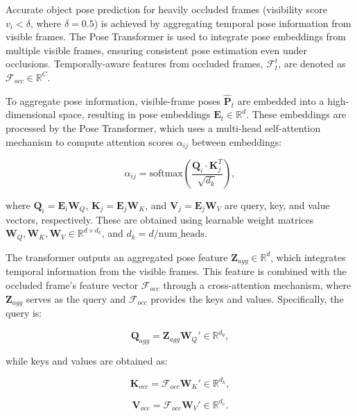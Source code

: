 Accurate object pose prediction for heavily occluded frames (visibility score $v_i < \delta$, where $\delta = 0.5$) is achieved by aggregating temporal pose information from visible frames. The Pose Transformer is used to integrate pose embeddings from multiple visible frames, ensuring consistent pose estimation even under occlusions. Temporally-aware features from occluded frames, $\mathcal{F}^t_t$, are denoted as $\mathcal{F}_{occ} \in \mathbb{R}^C$.

To aggregate pose information, visible-frame poses $\hat{\mathbf{P}}_t$ are embedded into a high-dimensional space, resulting in pose embeddings $\mathbf{E}_t \in \mathbb{R}^d$. These embeddings are processed by the Pose Transformer, which uses a multi-head self-attention mechanism to compute attention scores $\alpha_{ij}$ between embeddings:

\begin{equation}
\alpha_{ij} = \text{softmax}\left(\frac{\mathbf{Q}_i \cdot \mathbf{K}_j^T}{\sqrt{d_k}}\right),
\end{equation}

\noindent where $\mathbf{Q}_i = \mathbf{E}_i \mathbf{W}_Q$, $\mathbf{K}_j = \mathbf{E}_j \mathbf{W}_K$, and $\mathbf{V}_j = \mathbf{E}_j \mathbf{W}_V$ are query, key, and value vectors, respectively. These are obtained using learnable weight matrices $\mathbf{W}_Q, \mathbf{W}_K, \mathbf{W}_V \in \mathbb{R}^{d \times d_k}$, and $d_k = d / \text{num\_heads}$.

The transformer outputs an aggregated pose feature $\mathbf{Z}_{agg} \in \mathbb{R}^d$, which integrates temporal information from the visible frames. This feature is combined with the occluded frame's feature vector $\mathcal{F}_{occ}$ through a cross-attention mechanism, where $\mathbf{Z}_{agg}$ serves as the query and $\mathcal{F}_{occ}$ provides the keys and values. Specifically, the query is:

\begin{equation}
\mathbf{Q}_{agg} = \mathbf{Z}_{agg} \mathbf{W}_Q' \in \mathbb{R}^{d_q},
\end{equation}

\noindent while keys and values are obtained as:

\begin{equation}
\mathbf{K}_{occ} = \mathcal{F}_{occ} \mathbf{W}_K' \in \mathbb{R}^{d_k},
\end{equation}

\begin{equation}
\mathbf{V}_{occ} = \mathcal{F}_{occ} \mathbf{W}_V' \in \mathbb{R}^{d_v}.
\end{equation}

